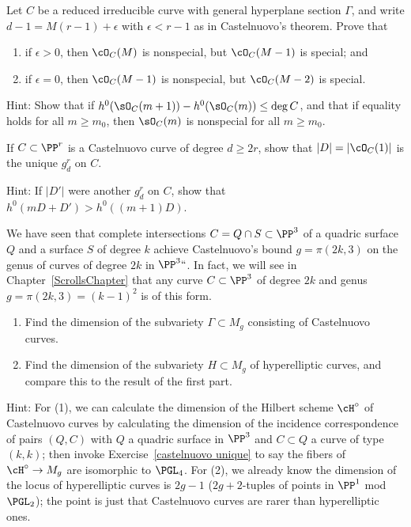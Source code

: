 \begin{exercise}
Let $C$ be a reduced irreducible curve with general hyperplane section
$\Gamma$,
and write
$d-1 = M(r-1) +\epsilon$ with $\epsilon<r-1$ as in Castelnuovo's theorem.
Prove that
\begin{enumerate}
\item if $\epsilon > 0$, then $\cO_C(M)$ is nonspecial, but $\cO_C(M-1)$
is special; and
\item if $\epsilon = 0$, then $\cO_C(M-1)$ is nonspecial, but $\cO_C(M-2)$
%
is special.
\end{enumerate}

Hint: Show that if $h^{0}(\sO_{C}(m+1))-h^{0}(\sO_{C}(m)) \leq \deg C$,
and that if equality holds for
all $m\geq m_{0}$, then $\sO_{C}(m) $ is nonspecial for all $m\geq m_{0}$.
\end{exercise}

\begin{exercise}\label{castelnuovo unique}
If $C \subset \PP^r$ is a 
Castelnuovo curve
%
of degree $d \geq 2r$,
show that $|D| = |\cO_C(1)|$ is the unique $g^r_d$ on $C$.

Hint: If $|D'|$ were another $g^r_d$ on $C$, show that $h^0(mD + D')
> h^0((m+1)D)$.
\end{exercise}


\begin{exercise}\label{rarity of Castelnuovo}
We have seen that complete intersections $C = Q \cap S \subset \PP^3$ of a
quadric surface $Q$ and a surface $S$ of degree $k$ achieve Castelnuovo's
bound $g = \pi(2k, 3)$ on the genus of curves of degree $2k$ in $\PP^3`
`$. In fact, we will see in Chapter~\ref{ScrollsChapter} that any curve
$C \subset \PP^3$ of degree $2k$ and genus $g = \pi(2k, 3) = (k-1)^2$
is of this form.
\begin{enumerate}
\item Find the dimension of the subvariety $\Gamma \subset M_g$ consisting
of Castelnuovo curves.
\item Find the dimension of the subvariety $H \subset M_g$ of
hyperelliptic curves, and compare this to the result of the first part.
\end{enumerate}

Hint: For 
(1), 
we can calculate the dimension of the Hilbert
scheme $\cH^\circ$ of 
Castelnuovo curves
%
by calculating the dimension
of the incidence correspondence of pairs $(Q, C)$ with $Q$ a quadric
surface in $\PP^3$ and $C \subset Q$ a curve of type $(k,k)$; then invoke
Exercise~\ref{castelnuovo unique} to say the fibers of $\cH^\circ \to
M_g$ are isomorphic to 
%
%
$\PGL_4$.
For 
(2), 
we already know the
dimension of the locus of hyperelliptic curves is $2g-1$ ($2g+2$-tuples
of points in $\PP^1$ mod $\PGL_2$); the point is just that Castelnuovo
curves are rarer than hyperelliptic ones.
\end{exercise}





